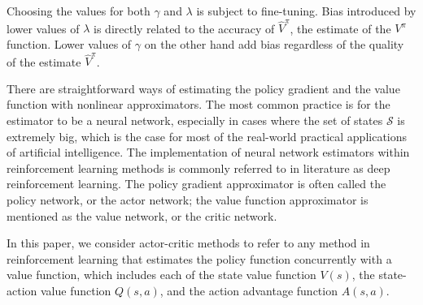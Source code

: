 Choosing the values for both $\gamma$ and $\lambda$ is subject to fine-tuning. Bias introduced by lower values of $\lambda$ is directly related to the accuracy of $\hat{V}^\pi$, the estimate of the $V^\pi$ function. Lower values of $\gamma$ on the other hand add bias regardless of the quality of the estimate $\hat{V}^\pi$.

There are straightforward ways of estimating the policy gradient and the value function with nonlinear approximators. The most common practice is for the estimator to be a neural network, especially in cases where the set of states $\mathcal{S}$ is extremely big, which is the case for most of the real-world practical applications of artificial intelligence. The implementation of neural network estimators within reinforcement learning methods is commonly referred to in literature as deep reinforcement learning. The policy gradient approximator is often called the policy network, or the actor network; the value function approximator is mentioned as the value network, or the critic network.

In this paper, we consider actor-critic methods to refer to any method in reinforcement learning that estimates the policy function concurrently with a value function, which includes each of the state value function $V(s)$, the state-action value function $Q(s,a)$, and the action advantage function $A(s,a)$.
